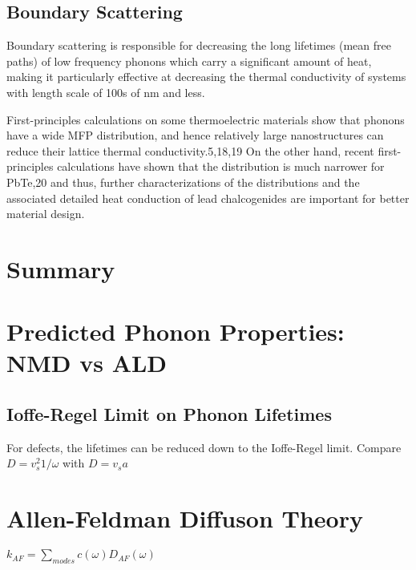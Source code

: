 \documentclass[aps,prb,preprint,superscriptaddress,amsmath,amssymb,floatfix]{revtex4}
\begin{document}
\subsection{\label{S:}Boundary Scattering}
Boundary scattering is responsible for decreasing the long lifetimes 
(mean free paths) of low frequency phonons which carry a significant 
amount of heat, making it particularly effective at decreasing the 
thermal conductivity of systems with length scale of 100s of nm and 
less.\cite{mcgaughey_nanostructure_2012}

First-principles calculations on some thermoelectric
materials show that phonons have a wide MFP distribution,
and hence relatively large nanostructures can reduce their
lattice thermal conductivity.5,18,19 On the other hand, recent
first-principles calculations have shown that the distribution is
much narrower for PbTe,20 and thus, further characterizations
of the distributions and the associated detailed heat conduction
of lead chalcogenides are important for better material design.
\section{\label{S:}Summary}


\appendix
\section{\label{A:}Predicted Phonon Properties: NMD vs ALD}

\subsection{\label{A:}Ioffe-Regel Limit on Phonon Lifetimes}
For defects, the lifetimes can be reduced down to the Ioffe-Regel limit. 
Compare $D = v_s^2 1/\omega$ with  $D = v_s a $
\section{\label{A:}Allen-Feldman Diffuson Theory}
$k_{AF} = \sum_{modes} c(\omega)D_{AF}(\omega)$ 
\end{document}
